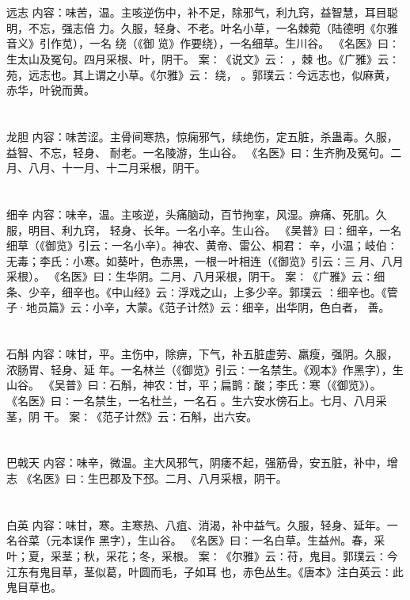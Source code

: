 \documentclass[12pt,UTF8]{ctexbook}
\begin{document}
\chapter{}远志
内容：味苦，温。主咳逆伤中，补不足，除邪气，利九窍，益智慧，耳目聪明，不忘，强志倍 
力。久服，轻身、不老。叶名小草，一名棘菀（陆德明《尔雅音义》引作苋），一名 绕（《御 
览》作要绕），一名细草。生川谷。 
《名医》曰∶生太山及冤句。四月采根、叶，阴干。 
案∶《说文》云∶ ，棘 也。《广雅》云∶ 苑，远志也。其上谓之小草。《尔雅》云∶ 
绕， 。郭璞云∶今远志也，似麻黄，赤华，叶锐而黄。 


\chapter{}龙胆
内容：味苦涩。主骨间寒热，惊痫邪气，续绝伤，定五脏，杀蛊毒。久服，益智、不忘，轻身、 
耐老。一名陵游，生山谷。 
《名医》曰∶生齐朐及冤句。二月、八月、十一月、十二月采根，阴干。 


\chapter{}细辛
内容：味辛，温。主咳逆，头痛脑动，百节拘挛，风湿。痹痛、死肌。久服，明目、利九窍， 
轻身、长年。一名小辛。生山谷。 
《吴普》曰∶细辛，一名细草（《御览》引云∶一名小辛）。神农、黄帝、雷公、桐君∶ 
辛，小温；岐伯∶无毒；李氏∶小寒。如葵叶，色赤黑，一根一叶相连（《御览》引云∶三 
月、八月采根）。 
《名医》曰∶生华阴。二月、八月采根，阴干。 
案∶《广雅》云∶细条、少辛，细辛也。《中山经》云∶浮戏之山，上多少辛。郭璞云 
∶细辛也。《管子·地员篇》云∶小辛，大蒙。《范子计然》云∶细辛，出华阴，色白者， 
善。 


\chapter{}石斛
内容：味甘，平。主伤中，除痹，下气，补五脏虚劳、羸瘦，强阴。久服，浓肠胃、轻身、延 
年。一名林兰（《御览》引云∶一名禁生。《观本》作黑字），生山谷。 
《吴普》曰∶石斛，神农∶甘，平；扁鹊∶酸；李氏∶寒（《御览》）。 
《名医》曰∶一名禁生，一名杜兰，一名石 。生六安水傍石上。七月、八月采茎，阴 
干。 
案∶《范子计然》云∶石斛，出六安。 


\chapter{}巴戟天
内容：味辛，微温。主大风邪气，阴痿不起，强筋骨，安五脏，补中，增志 
《名医》曰∶生巴郡及下邳。二月、八月采根，阴干。 


\chapter{}白英
内容：味甘，寒。主寒热、八疽、消渴，补中益气。久服，轻身、延年。一名谷菜（元本误作 
黑字），生山谷。 
《名医》曰∶一名白草。生益州。春，采叶；夏，采茎；秋，采花；冬，采根。 
案∶《尔雅》云∶苻，鬼目。郭璞云∶今江东有鬼目草，茎似葛，叶圆而毛，子如耳 
也，赤色丛生。《唐本》注白英云∶此鬼目草也。 
\end{document}
